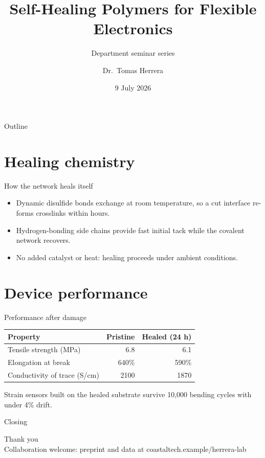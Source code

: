 \documentclass[aspectratio=169]{beamer}
\title[Self-Healing Polymers]{Self-Healing Polymers for Flexible Electronics}
\subtitle{Department seminar series}
\author[T. Herrera]{Dr.\ Tomas Herrera}
\institute[Coastal Tech]{Department of Materials Science, Coastal Technical University}
\date{9 July 2026}
\begin{document}
\begin{frame}
  \titlepage
\end{frame}

\begin{frame}{Outline}
  \tableofcontents
\end{frame}

\section{Healing chemistry}

\begin{frame}{How the network heals itself}
  \begin{itemize}
    \item Dynamic disulfide bonds exchange at room temperature, so a cut
          interface re-forms crosslinks within hours.
    \item Hydrogen-bonding side chains provide fast initial tack while the
          covalent network recovers.
    \item No added catalyst or heat: healing proceeds under ambient conditions.
  \end{itemize}
\end{frame}

\section{Device performance}

\begin{frame}{Performance after damage}
  \begin{table}
    \centering
    \begin{tabular}{lrr}
      \toprule
      Property & Pristine & Healed (24 h) \\
      \midrule
      Tensile strength (MPa) & 6.8 & 6.1 \\
      Elongation at break & 640\% & 590\% \\
      Conductivity of trace (S/cm) & 2100 & 1870 \\
      \bottomrule
    \end{tabular}
  \end{table}
  \vspace{0.5em}
  Strain sensors built on the healed substrate survive 10,000 bending
  cycles with under 4\% drift.
\end{frame}

\begin{frame}{Closing}
  \begin{center}
    {\Large Thank you}\\[1em]
    Collaboration welcome: preprint and data at coastaltech.example/herrera-lab
  \end{center}
\end{frame}
\end{document}
